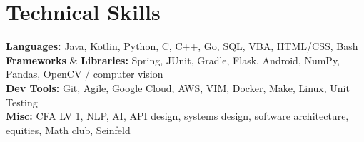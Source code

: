 \documentclass[12pt, letter]{article}
\makeatletter
\newcommand{\resumeItem}[1]{
  \item\small{
    {#1 \vspace{-2pt}}
  }
}
\newcommand{\resumeSubSubheading}[2]{
    \item
    \begin{tabular*}{0.97\textwidth}{l@{\extracolsep{\fill}}r}
      \textit{\small#1} & \textit{\small #2} \\
    \end{tabular*}\vspace{-7pt}
}
\newcommand{\resumeSubHeadingListEnd}{\end{itemize}}
\newcommand{\resumeItemListStart}{\begin{itemize}[noitemsep]} %
\newcommand{\resumeItemListEnd}{\end{itemize}\vspace{-16pt}}
\makeatother
\begin{document}
\vspace{-10pt}




\section{Technical Skills}
{\small
\textbf{Languages:} Java, Kotlin, Python, C, C++, Go, SQL, VBA, HTML/CSS, Bash \\
\textbf{Frameworks} \& \textbf{Libraries:} Spring, JUnit, Gradle, Flask, Android, NumPy, Pandas, OpenCV / computer vision \\
\textbf{Dev Tools:} Git, Agile, Google Cloud, AWS, VIM, Docker, Make, Linux, Unit Testing \\
\textbf{Misc:} CFA LV 1, NLP, AI, API design, systems design, software architecture, equities, Math club, Seinfeld
}
\end{document}
